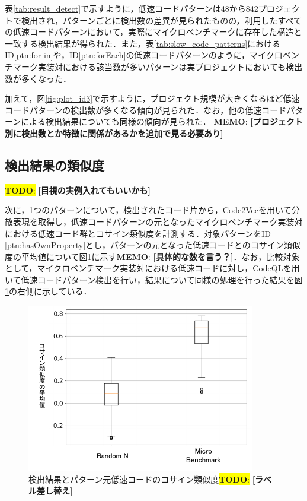 \documentclass[submit,techrep,noauthor]{ipsj}
\newcommand{\todo}[1]{\colorbox{yellow}{{\bf TODO}:}{\color{red} {\textbf{[#1]}}}}
\newcommand{\memo}[1]{\colorbox{magenta!30}{{\bf MEMO}:}{\color{red!50} {\textbf{[#1]}}}}
\begin{document}
表\ref{tab:result_detect}で示すように，低速コードパターンは48から842プロジェクトで検出され，パターンごとに検出数の差異が見られたものの，利用したすべての低速コードパターンにおいて，実際にマイクロベンチマークに存在した構造と一致する検出結果が得られた．また，表\ref{tab:slow_code_patterns}におけるID\ref{ptn:for-in}や，ID\ref{ptn:forEach}の低速コードパターンのように，マイクロベンチマーク実装対における該当数が多いパターンは実プロジェクトにおいても検出数が多くなった．

加えて，図\ref{fig:plot_id3}で示すように，プロジェクト規模が大きくなるほど低速コードパターンの検出数が多くなる傾向が見られた．なお，他の低速コードパターンによる検出結果についても同様の傾向が見られた．
\memo{プロジェクト別に検出数とか特徴に関係があるかを追加で見る必要あり}


\subsection{検出結果の類似度}\todo{目視の実例入れてもいいかも}

次に，1つのパターンについて，検出されたコード片から，Code2Vecを用いて分散表現を取得し，低速コードパターンの元となったマイクロベンチマーク実装対における低速コード群とコサイン類似度を計測する．対象パターンをID \ref{ptn:hasOwnProperty}とし，パターンの元となった低速コードとのコサイン類似度の平均値について図\ref{fig:boxplot_cosine}に示す\memo{具体的な数を言う？}．なお，比較対象として，マイクロベンチマーク実装対における低速コードに対し，CodeQLを用いて低速コードパターン検出を行い，結果について同様の処理を行った結果を図\ref{fig:boxplot_cosine}の右側に示している．


\begin{figure}[h!]
    \centering
    \includegraphics[width=0.9\linewidth]{./Noguchi_fig/boxplot_compare.pdf}
    \caption{検出結果とパターン元低速コードのコサイン類似度\todo{ラベル差し替え}}
    \label{fig:boxplot_cosine}
\end{figure}
\end{document}
